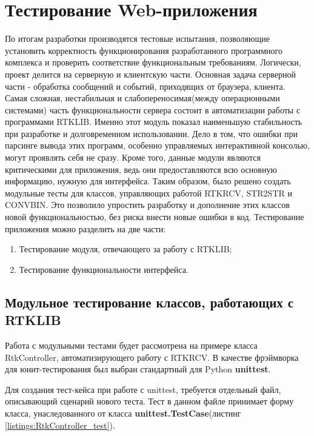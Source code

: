 \chapter{Тестирование Web-приложения} \label{chapt4}

По итогам разработки производятся тестовые испытания, позволяющие установить корректность функционирования разработанного программного комплекса и проверить соответствие функциональным требованиям. Логически, проект делится на серверную и клиентскую части. Основная задача серверной части - обработка сообщений и событий, приходящих от браузера, клиента. Самая сложная, нестабильная и слабопереносимая(между операционными системами) часть функциональности сервера состоит в автоматизации работы с программами RTKLIB. Именно этот модуль показал наименьшую стабильность при разработке и долговременном использовании. Дело в том, что ошибки при парсинге вывода этих программ, особенно управляемых интерактивной консолью, могут проявлять себя не сразу. Кроме того, данные модули являются критическими для приложения, ведь они предоставляются всю основную информацию, нужную для интерфейса. Таким образом, было решено создать модульные тесты для классов, управляющих работой RTKRCV, STR2STR и CONVBIN. Это позволило упростить разработку и дополнение этих классов новой функциональностью, без риска внести новые ошибки в код. Тестирование приложения можно разделить на две части:

\begin{enumerate}
  \item Тестирование модуля, отвечающего за работу с RTKLIB;
  \item Тестирование функциональности интерфейса.
\end{enumerate}

\section{Модульное тестирование классов, работающих с RTKLIB} \label{sect4_1}

Работа с модульными тестами будет рассмотрена на примере класса RtkController, автоматизирующего работу с RTKRCV. В качестве фрэймворка для юнит-тестирования был выбран стандартный для Python \textbf{unittest}.

Для создания тест-кейса при работе с unittest, требуется отдельный файл, описывающий сценарий нового теста. Тест в данном файле принимает форму класса, унаследованного от класса \textbf{unittest.TestCase}(листинг \ref{listings:RtkController_test}).

